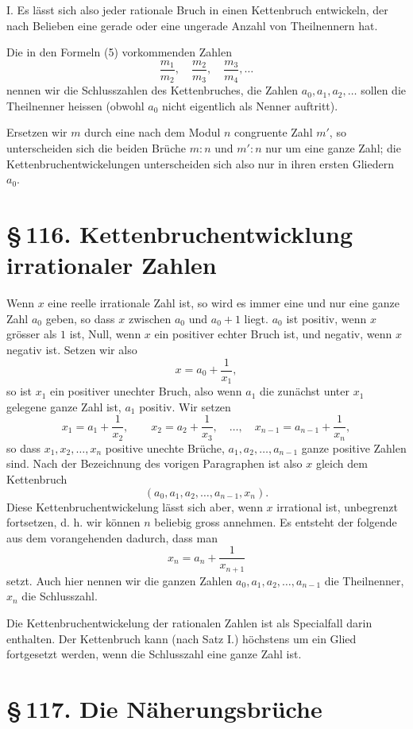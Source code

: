 \documentclass[11pt]{article}
\providecommand{\sect}[2]{\section*{\S\,#1. #2}}
\begin{document}
I. Es lässt sich also jeder rationale Bruch in einen Kettenbruch entwickeln, der nach Belieben eine gerade oder eine ungerade Anzahl von Theilnennern hat.

Die in den Formeln (5) vorkommenden Zahlen
\[
        \frac{m_1}{m_2},\quad \frac{m_2}{m_3},\quad \frac{m_3}{m_4},\ldots
\]
nennen wir die Schlusszahlen des Kettenbruches, die Zahlen $a_0,a_1,a_2,\ldots$ sollen die Theilnenner heissen (obwohl $a_0$ nicht eigentlich als Nenner auftritt).

Ersetzen wir $m$ durch eine nach dem Modul $n$ congruente Zahl $m'$, so unterscheiden sich die beiden Brüche $m:n$ und $m':n$ nur um eine ganze Zahl; die Kettenbruchentwickelungen unterscheiden sich also nur in ihren ersten Gliedern $a_0$.

\sect{116}{Kettenbruchentwicklung irrationaler Zahlen}

Wenn $x$ eine reelle irrationale Zahl ist, so wird es immer eine und nur eine ganze Zahl $a_0$ geben, so dass $x$ zwischen $a_0$ und $a_0+1$ liegt. $a_0$ ist positiv, wenn $x$ grösser als $1$ ist, Null, wenn $x$ ein positiver echter Bruch ist, und negativ, wenn $x$ negativ ist. Setzen wir also
\[
        x=a_0+\frac1{x_1},
\]
so ist $x_1$ ein positiver unechter Bruch, also wenn $a_1$ die zunächst unter $x_1$ gelegene ganze Zahl ist, $a_1$ positiv. Wir setzen
\[
        x_1=a_1+\frac1{x_2},\qquad
        x_2=a_2+\frac1{x_3},\quad\ldots,\quad
        x_{n-1}=a_{n-1}+\frac1{x_n},
\]
so dass $x_1,x_2,\ldots,x_n$ positive unechte Brüche, $a_1,a_2,\ldots,a_{n-1}$ ganze positive Zahlen sind. Nach der Bezeichnung des vorigen Paragraphen ist also $x$ gleich dem Kettenbruch
\[
        (a_0,a_1,a_2,\ldots,a_{n-1},x_n).
\]
Diese Kettenbruchentwickelung lässt sich aber, wenn $x$ irrational ist, unbegrenzt fortsetzen, d. h. wir können $n$ beliebig gross annehmen. Es entsteht der folgende aus dem vorangehenden dadurch, dass man
\[
        x_n=a_n+\frac1{x_{n+1}}
\]
setzt. Auch hier nennen wir die ganzen Zahlen $a_0,a_1,a_2,\ldots,a_{n-1}$ die Theilnenner, $x_n$ die Schlusszahl.

Die Kettenbruchentwickelung der rationalen Zahlen ist als Specialfall darin enthalten. Der Kettenbruch kann (nach Satz I.) höchstens um ein Glied fortgesetzt werden, wenn die Schlusszahl eine ganze Zahl ist.


\sect{117}{Die Näherungsbrüche}
\end{document}
